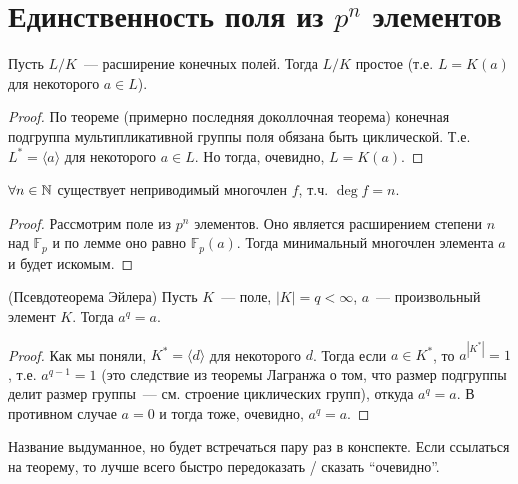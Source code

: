 \section{Единственность поля из $p^n$ элементов}
\begin{lemma}
    Пусть $L/K$~--- расширение конечных полей.
    Тогда $L/K$ простое (т.е. $L=K(a)$ для некоторого $a\in L$).
\end{lemma}
\begin{proof}
    По теореме (примерно последняя доколлочная теорема) конечная подгруппа мультипликативной группы поля обязана быть циклической.
    Т.е. $L^* = \langle a \rangle$ для некоторого $a\in L$.
    Но тогда, очевидно, $L=K(a)$.
\end{proof}
\follow $\forall n\in \mathbb{N}$ существует неприводимый многочлен $f$, т.ч. $\deg f = n$.
\begin{proof}
    Рассмотрим поле из $p^n$ элементов.
    Оно является расширением степени $n$ над $\mathbb{F}_p$ и по лемме оно равно $\mathbb{F}_p(a)$.
    Тогда минимальный многочлен элемента $a$ и будет искомым.
\end{proof}

\begin{theorem}(Псевдотеорема Эйлера)
    Пусть $K$~--- поле, $|K|=q<\infty$, $a$~--- произвольный элемент $K$.
    Тогда $a^q=a$.
\end{theorem}
\begin{proof}
    Как мы поняли, $K^* = \langle d\rangle$ для некоторого $d$.
    Тогда если $a\in K^*$, то $a^{|K^*|}=1$, т.е. $a^{q-1}=1$ (это следствие из теоремы Лагранжа о том, что размер подгруппы делит размер группы~--- см. строение циклических групп), откуда $a^q=a$.
    В противном случае $a=0$ и тогда тоже, очевидно, $a^q=a$.
\end{proof}
\notice Название выдуманное, но будет встречаться пару раз в конспекте.
Если ссылаться на теорему, то лучше всего быстро передоказать / сказать ``очевидно''.

